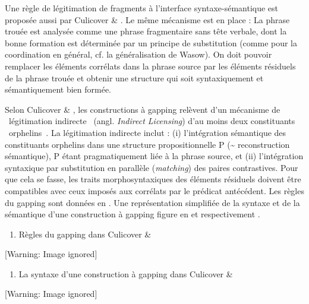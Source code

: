Une règle de légitimation de fragments à l'interface syntaxe-sémantique est proposée aussi par Culicover \& \citet{Jackendoff2005}. Le même mécanisme est en place : La phrase trouée est analysée comme une phrase fragmentaire sans tête verbale, dont la bonne formation est déterminée par un principe de substitution (comme pour la coordination en général, cf. la généralisation de Wasow). On doit pouvoir remplacer les éléments corrélats dans la phrase source par les éléments résiduels de la phrase trouée et obtenir une structure qui soit syntaxiquement et sémantiquement bien formée. 

Selon Culicover \& \citet{Jackendoff2005}, les constructions à gapping relèvent d'un mécanisme de {\guillemotleft}~légitimation indirecte~{\guillemotright} (angl. \textit{Indirect Licensing}) d'au moins deux constituants {\guillemotleft}~orphelins~{\guillemotright}. La légitimation indirecte inclut : (i) l'intégration sémantique des constituants orphelins dans une structure propositionnelle P (\~{} reconstruction sémantique), P étant pragmatiquement liée à la phrase source, et (ii) l'intégration syntaxique par substitution en parallèle (\textit{matching}) des paires contrastives. Pour que cela se fasse, les traits morphosyntaxiques des éléments résiduels doivent être compatibles avec ceux imposés aux corrélats par le prédicat antécédent. Les règles du gapping sont données en . Une représentation simplifiée de la syntaxe et de la sémantique d'une construction à gapping figure en  et respectivement .


\begin{enumerate}
\item   \label{bkm:Ref300950575}Règles du gapping dans Culicover \& \citet{Jackendoff2005}


\end{enumerate}
  [Warning: Image ignored] %
 


\begin{enumerate}
\item   \label{bkm:Ref300950610}La syntaxe d'une construction à gapping dans Culicover \& \citet{Jackendoff2005}


\end{enumerate}
{   [Warning: Image ignored] %
} 


